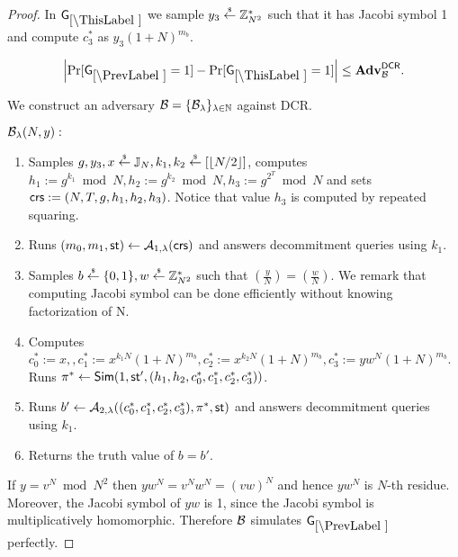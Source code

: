\begin{proof}
In $\games_\thisgame$ we sample $y_3 \stackrel{{\scriptscriptstyle\$}}{\leftarrow} \mathbb{Z}_{N^2}^*$ such that it has Jacobi symbol 1 and compute $c_3^*$ as $y_3(1+N)^{m_b}$. 

\begin{lemma}\label{lem:dcr-rom-lh}
\[
\left|\Pr[\games_\prevgame = 1] - \Pr[\games_\thisgame = 1]\right| \leq \advtg_\advB^\dcr.
\]
\end{lemma}
We construct an adversary $\mathcal{B} = \{\mathcal{B}_{\lambda}\}_{\lambda \in \mathbb{N}}$ against DCR.

$\mathcal{B}_{\lambda}(N,y):$
\vspace{-2mm}
\begin{enumerate}
\item Samples $g, y_3, x \stackrel{{\scriptscriptstyle\$}}{\leftarrow} \mathbb{J}_N, k_1, k_2 \stackrel{{\scriptscriptstyle\$}}{\leftarrow} [\left\lfloor N/2 \right\rfloor]$, computes $h_1 := g^{k_1} \bmod N, h_2 := g^{k_2} \bmod N,  h_3 := g^{2^{T}} \bmod N$ and sets $\mathsf{crs}:=(N, T, g, h_1, h_2, h_3)$. Notice that value $h_3$ is computed by repeated squaring.
\item Runs $(m_0, m_1, \mathsf{st}) \leftarrow \mathcal{A}_{1, \lambda}(\mathsf{crs})$ and answers decommitment queries using $k_1$.
\item Samples $b \stackrel{{\scriptscriptstyle\$}}{\leftarrow} \{0,1\}, w \stackrel{{\scriptscriptstyle\$}}{\leftarrow} \mathbb{Z}_{N^2}^*$ such that $\left( \frac{y}{N} \right)= \left( \frac{w}{N} \right)$. We remark that computing Jacobi symbol can be done efficiently without knowing factorization of N.
\item Computes $c_0^*:=x, , c_1^*:=x^{k_1N}(1+N)^{m_b}, c_2^*:=x^{k_2N}(1+N)^{m_b}, c_3^*:=yw^{N}(1+N)^{m_b}$. Runs $\pi^* \leftarrow \mathsf{Sim}(1, \mathsf{st}', (h_1, h_2, c_0^*, c_1^*, c_2^*, c_3^*))$.
\item Runs $b' \leftarrow \mathcal{A}_{2, \lambda}((c_0^*, c_1^*, c_2^*, c_3^*), \pi^*, \mathsf{st})$ and answers decommitment queries using $k_1$.
\item Returns the truth value of $b=b'$.
\end{enumerate}

If $y = v^N \bmod N^2$ then $yw^N = v^N w^N = (vw)^N$ and hence $yw^N$ is $N$-th residue. Moreover, the Jacobi symbol of $yw$ is 1, since the Jacobi symbol is multiplicatively homomorphic. Therefore $\mathcal{B}$ simulates $\games_\prevgame$ perfectly. 


\end{proof}
